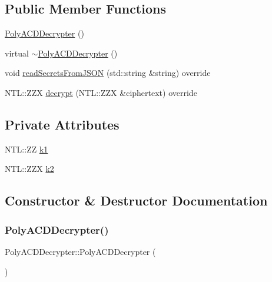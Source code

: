 \subsection*{Public Member Functions}
\begin{DoxyCompactItemize}
\item 
\hyperlink{classPolyACDDecrypter_ad83cc12ab1b782090b0d14489e5e114c}{Poly\+A\+C\+D\+Decrypter} ()
\item 
virtual \hyperlink{classPolyACDDecrypter_a91c523391a2d25bd27160ef045f19c79}{$\sim$\+Poly\+A\+C\+D\+Decrypter} ()
\item 
void \hyperlink{classPolyACDDecrypter_a55e7f81c6d8d10e00e072547ac68239a}{read\+Secrets\+From\+J\+S\+ON} (std\+::string \&string) override
\item 
N\+T\+L\+::\+Z\+ZX \hyperlink{classPolyACDDecrypter_a96626f2c267d9cc4b18ed25cb584d982}{decrypt} (N\+T\+L\+::\+Z\+ZX \&ciphertext) override
\end{DoxyCompactItemize}
\subsection*{Private Attributes}
\begin{DoxyCompactItemize}
\item 
N\+T\+L\+::\+ZZ \hyperlink{classPolyACDDecrypter_a86ca294cafa0cd5fa070d43127bd8c01}{k1}
\item 
N\+T\+L\+::\+Z\+ZX \hyperlink{classPolyACDDecrypter_a3b0967ca5e6df810ef952521eadefa44}{k2}
\end{DoxyCompactItemize}


\subsection{Constructor \& Destructor Documentation}
\mbox{\label{classPolyACDDecrypter_ad83cc12ab1b782090b0d14489e5e114c}} 
\subsubsection{\texorpdfstring{Poly\+A\+C\+D\+Decrypter()}{PolyACDDecrypter()}}
{\footnotesize\ttfamily Poly\+A\+C\+D\+Decrypter\+::\+Poly\+A\+C\+D\+Decrypter (\begin{DoxyParamCaption}{ }\end{DoxyParamCaption})}


